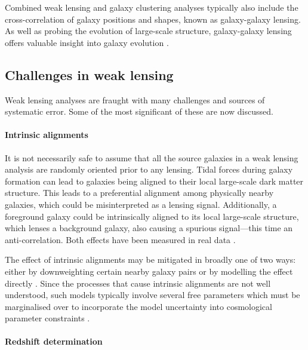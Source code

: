 Combined weak lensing and galaxy clustering analyses typically also include the cross-correlation of galaxy positions and shapes, known as galaxy-galaxy lensing. As well as probing the evolution of large-scale structure, galaxy-galaxy lensing offers valuable insight into galaxy evolution \citep[e.g.][]{Zacharegkas2022}.

\subsection{Challenges in weak lensing}
\label{co_Sec:wl_challenges}

Weak lensing analyses are fraught with many challenges and sources of systematic error. Some of the most significant of these are now discussed.

\paragraph{Intrinsic alignments}

It is not necessarily safe to assume that all the source galaxies in a weak lensing analysis are randomly oriented prior to any lensing. Tidal forces during galaxy formation can lead to galaxies being aligned to their local large-scale dark matter structure. This leads to a preferential alignment among physically nearby galaxies, which could be misinterpreted as a lensing signal. Additionally, a foreground galaxy could be intrinsically aligned to its local large-scale structure, which lenses a background galaxy, also causing a spurious signal---this time an anti-correlation. Both effects have been measured in real data \citep{Brown2002, Hirata2004, Joachimi2011, Mandelbaum2011, Singh2015}.

The effect of intrinsic alignments may be mitigated in broadly one of two ways: either by downweighting certain nearby galaxy pairs \citep{Heymans2003, Heymans2004, Joachimi2008ia} or by modelling the effect directly \citep{Bridle2007, Schneider2010, Blazek2015, Blazek2019, Fortuna2021, Samuroff2021, Harnois-Deraps2022}. Since the processes that cause intrinsic alignments are not well understood, such models typically involve several free parameters which must be marginalised over to incorporate the model uncertainty into cosmological parameter constraints \citep[e.g.][]{Joachimi2010, Troxel2015, Amon2021}.

\paragraph{Redshift determination}

